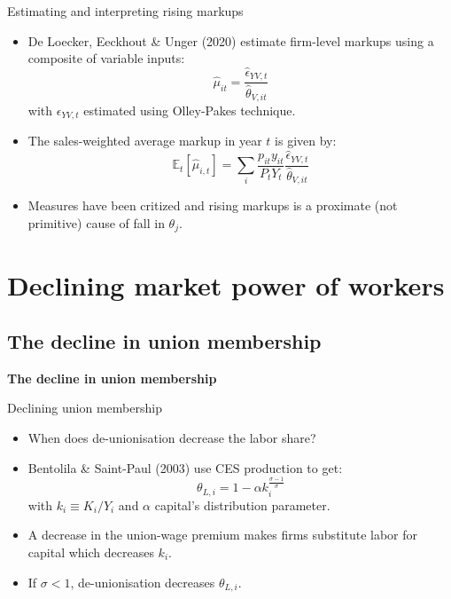 \documentclass[notes=show]{beamer}
\begin{document}
\begin{frame}{Estimating and interpreting rising markups}
\begin{itemize}
\item De Loecker, Eeckhout \& Unger (2020) estimate firm-level markups using a composite of variable inputs:
\begin{equation*}
    \hat{\mu}_{it} = \frac{\hat{\epsilon}_{YV,t}}{\hat{\theta}_{V,it}} 
\end{equation*}
with $ \epsilon_{YV,t}$ estimated using Olley-Pakes technique. \medskip
\item The sales-weighted average markup in year $t$ is given by:
\begin{equation*}
    \mathbb{E}_{t}{[\hat{\mu}_{i,t}]} = \sum_{i} \frac{p_{it}y_{it}}{P_{t}Y_{t}} \frac{\hat{\epsilon}_{YV,t}}{\hat{\theta}_{V,it}} 
\end{equation*}
\item Measures have been critized and rising markups is a proximate (not primitive) cause of fall in $ \theta_{j}$.
\end{itemize}
\end{frame}

\section{Declining market power of workers}

\subsection*{The decline in union membership}

\begin{frame}
	\centering
	\textbf{The decline in union membership}
\end{frame}

\begin{frame}{Declining union membership}
\begin{itemize}
\item When does de-unionisation decrease the labor share? \medskip
\item Bentolila \& Saint-Paul (2003) use CES production to get:
\begin{equation*}
    \theta_{L,i} = 1 - \alpha k_{i}^{\frac{\sigma - 1}{\sigma}} \tag{BS-10}
\end{equation*}
with $ k_{i} \equiv K_{i} / Y_{i} $ and $ \alpha$ capital's distribution parameter. \medskip
\item A decrease in the union-wage premium makes firms substitute labor for capital which decreases $k_{i}$. \medskip
\item If $\sigma < 1 $, de-unionisation decreases $\theta_{L,i}$.
\end{itemize}
\end{frame}
\end{document}
